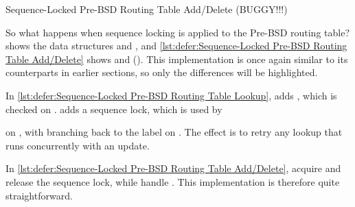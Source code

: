 \begin{listing}

\caption{Sequence-Locked Pre-BSD Routing Table Add\slash Delete (BUGGY!!!)}
\label{lst:defer:Sequence-Locked Pre-BSD Routing Table Add/Delete}
\end{listing}

So what happens when sequence locking is applied to the Pre-BSD
routing table?
shows the data structures and , and
\cref{lst:defer:Sequence-Locked Pre-BSD Routing Table Add/Delete}
shows  and  ().
This implementation is once again similar to its counterparts in earlier
sections, so only the differences will be highlighted.

\begin{fcvref}
In
\cref{lst:defer:Sequence-Locked Pre-BSD Routing Table Lookup},
 adds , which is checked on
.
 adds a sequence lock, which is used by 
\end{fcvref}
\begin{fcvref}
on ,
with  branching back to
the  label on .
The effect is to retry any lookup that runs concurrently with an update.
\end{fcvref}

\begin{fcvref}
In
\cref{lst:defer:Sequence-Locked Pre-BSD Routing Table Add/Delete},
acquire and release the sequence lock,
while  handle .
This implementation is therefore quite straightforward.
\end{fcvref}

